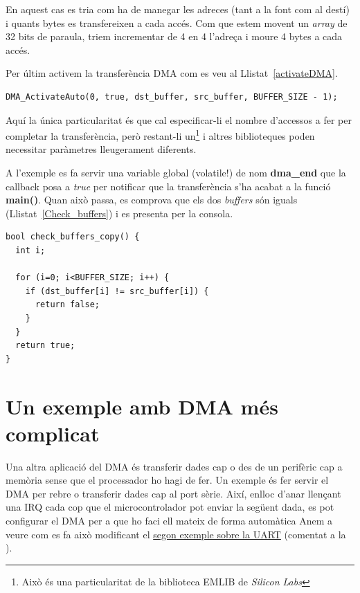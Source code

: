 En aquest cas es tria com ha de manegar les adreces (tant a la font com al destí) i quants bytes es transfereixen a cada accés. Com que estem movent un {\em array} de 32 bits de paraula, triem incrementar de 4 en 4 l'adreça i moure 4 bytes a cada accés.

Per últim activem la transferència \gls{DMA} com es veu al Llistat~\ref{activateDMA}.
\begin{lstlisting}[style=customc, caption={Activació de la transferència DMA}, label=activateDMA]
DMA_ActivateAuto(0, true, dst_buffer, src_buffer, BUFFER_SIZE - 1);
\end{lstlisting}

Aquí la única particularitat és que cal especificar-li el nombre d'accessos a fer per completar la transferència, però restant-li un\footnote{Això és una particularitat de la biblioteca EMLIB de {\em Silicon Labs}} i altres biblioteques poden necessitar paràmetres lleugerament diferents.

A l'exemple es fa servir una variable global (volatile!) de nom {\bf dma\_end} que la \gls{callback} posa a {\em true} per notificar que la transferència s'ha acabat a la funció {\bf main()}. Quan això passa, es comprova que els dos {\em buffers} són iguals (Llistat~\ref{Check_buffers}) i es presenta per la consola.

\begin{lstlisting}[style=customc, caption={Comparació dels dos buffers de l'exemple DMA}, label=Check_buffers]
bool check_buffers_copy() {
  int i;

  for (i=0; i<BUFFER_SIZE; i++) {
    if (dst_buffer[i] != src_buffer[i]) {
      return false;
    }
  }
  return true;
}
\end{lstlisting}


\section{Un exemple amb DMA més complicat}
\label{sec:DMA_example_2}

Una altra aplicació del \gls{DMA} és transferir dades cap o des de un perifèric cap a memòria sense que el processador ho hagi de fer. Un exemple és fer servir el DMA per rebre o transferir dades cap al port sèrie. Així, enlloc d'anar llençant una \gls{IRQ} cada cop que el microcontrolador pot enviar la següent dada, es pot configurar el DMA per a que ho faci ell mateix de forma automàtica Anem a veure com es fa això modificant el \href{https://sistemesencastats.wordpress.com/2018/03/08/serie-i-usb-cp2102/}{segon exemple sobre la UART} (comentat a la ).


